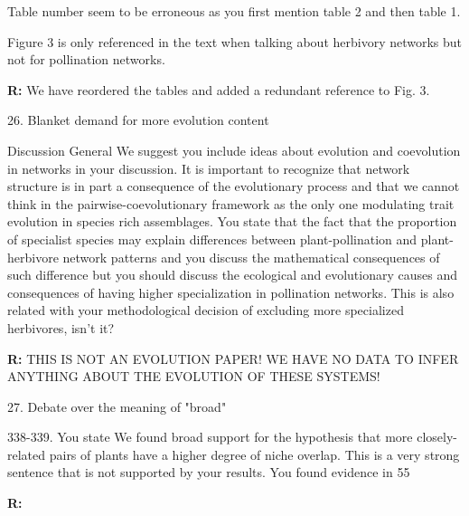 \documentclass[12pt]{letter}
\newenvironment{refquote}{\bigskip \begin{it}}{\end{it}\smallskip}
\begin{document}
		\begin{refquote}
			Table number seem to be erroneous as you first mention table 2 and then table 1.

			\smallskip

			Figure 3 is only referenced in the text when talking about herbivory networks but not for pollination networks.
		\end{refquote}

		\textbf{R:} We have reordered the tables and added a redundant reference to Fig. 3.


	26. Blanket demand for more evolution content

		\begin{refquote}
			Discussion
			General
			We suggest you include ideas about evolution and coevolution in networks in your discussion. It is important to recognize that network structure is in part a consequence of the evolutionary process and that we cannot think in the pairwise-coevolutionary framework as the only one modulating trait evolution in species rich assemblages.
			You state that the fact that the proportion of specialist species may explain differences between plant-pollination and plant-herbivore network patterns and you discuss the mathematical consequences of such difference but you should discuss the ecological and evolutionary causes and consequences of having higher specialization in pollination networks. This is also related with your methodological decision of excluding more specialized herbivores, isn't it?
		\end{refquote}

		\textbf{R:} THIS IS NOT AN EVOLUTION PAPER! WE HAVE NO DATA TO INFER ANYTHING ABOUT THE EVOLUTION OF THESE SYSTEMS!


	27. Debate over the meaning of "broad"

		\begin{refquote}
			338-339. You state We found broad support for the hypothesis that more closely-related pairs of plants have a higher degree of niche overlap. This is a very strong sentence that is not supported by your results. You found evidence in 55%
		\end{refquote}


		\textbf{R:}
\end{document}
